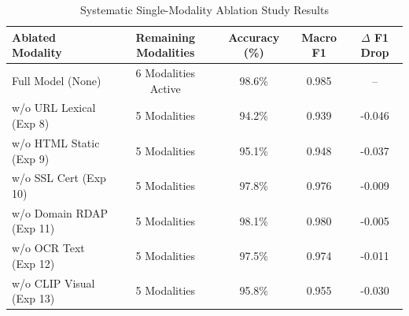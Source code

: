 \begin{table}[htbp]
\caption{Systematic Single-Modality Ablation Study Results}
\label{tab:ablation_results}
\centering
\begin{tabular}{lcccc}
\hline
\textbf{Ablated Modality} & \textbf{Remaining Modalities} & \textbf{Accuracy (\%)} & \textbf{Macro F1} & \textbf{$\Delta$ F1 Drop} \\
\hline
Full Model (None) & 6 Modalities Active & 98.6\% & 0.985 & -- \\
w/o URL Lexical (Exp 8) & 5 Modalities & 94.2\% & 0.939 & -0.046 \\
w/o HTML Static (Exp 9) & 5 Modalities & 95.1\% & 0.948 & -0.037 \\
w/o SSL Cert (Exp 10) & 5 Modalities & 97.8\% & 0.976 & -0.009 \\
w/o Domain RDAP (Exp 11) & 5 Modalities & 98.1\% & 0.980 & -0.005 \\
w/o OCR Text (Exp 12) & 5 Modalities & 97.5\% & 0.974 & -0.011 \\
w/o CLIP Visual (Exp 13) & 5 Modalities & 95.8\% & 0.955 & -0.030 \\
\hline
\end{tabular}
\end{table}
